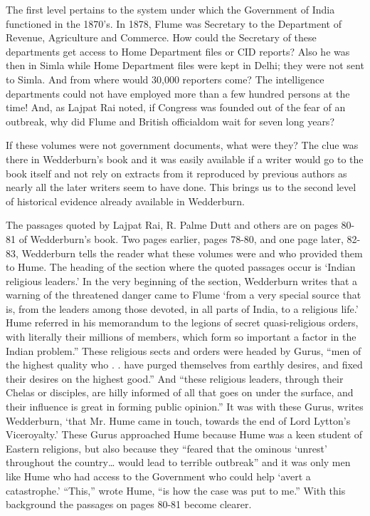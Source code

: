 \begin{multicols}{2}
The first level pertains to the system under which the Government of India functioned in the 1870's. In 1878, Flume was Secretary to the Department of Revenue, Agriculture and Commerce. How could the Secretary of these departments get access to Home Department files or CID reports? Also he was then in Simla while Home Department files were kept in Delhi; they were not sent to Simla. And from where would 30,000 reporters come? The intelligence departments could not have employed more than a few hundred persons at the time! And, as Lajpat Rai noted, if Congress was founded out of the fear of an outbreak, why did Flume and British officialdom wait for seven long years?

If these volumes were not government documents, what were they? The clue was there in Wedderburn's book and it was easily available if a writer would go to the book itself and not rely on extracts from it reproduced by previous authors as nearly all the later writers seem to have done. This brings us to the second level of historical evidence already available in Wedderburn.

The passages quoted by Lajpat Rai, R. Palme Dutt and others are on pages 80-81 of Wedderburn's book. Two pages earlier, pages 78-80, and one page later, 82-83, Wedderburn tells the reader what these volumes were and who provided them to Hume. The heading of the section where the quoted passages occur is `Indian religious leaders.' In the very beginning of the section, Wedderburn writes that a warning of the threatened danger came to Flume `from a very special source that is, from the leaders among those devoted, in all parts of India, to a religious life.' Hume referred in his memorandum to the legions of secret quasi-religious orders, with literally their millions of members, which form so important a factor in the Indian problem.'' These religious sects and orders were headed by Gurus, ``men of the highest quality who . . have purged themselves from earthly desires, and fixed their desires on the highest good.'' And ``these religious leaders, through their Chelas or disciples, are hilly informed of all that goes on under the surface, and their influence is great in forming public opinion.'' It was with these Gurus, writes Wedderburn, `that Mr. Hume came in touch, towards the end of Lord Lytton's Viceroyalty.' These Gurus approached Hume because Hume was a keen student of Eastern religions, but also because they ``feared that the ominous `unrest' throughout the country… would lead to terrible outbreak'' and it was only men like Hume who had access to the Government who could help `avert a catastrophe.' ``This,'' wrote Hume, ``is how the case was put to me.'' With this background the passages on pages 80-81 become clearer.


\end{multicols}
